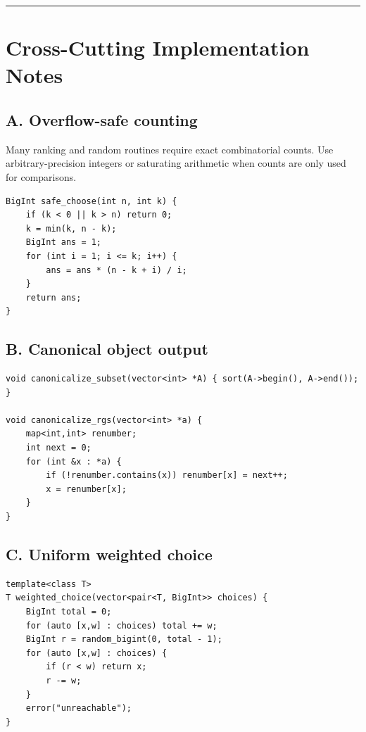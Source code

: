 \documentclass[11pt]{article}
\begin{document}
\begin{center}\rule{0.5\linewidth}{0.5pt}\end{center}

\section{Cross-Cutting Implementation Notes}\label{cross-cutting-implementation-notes}

\subsection{A. Overflow-safe counting}\label{a.-overflow-safe-counting}

Many ranking and random routines require exact combinatorial counts. Use arbitrary-precision integers or saturating arithmetic when counts are only used for comparisons.

\begin{verbatim}
BigInt safe_choose(int n, int k) {
    if (k < 0 || k > n) return 0;
    k = min(k, n - k);
    BigInt ans = 1;
    for (int i = 1; i <= k; i++) {
        ans = ans * (n - k + i) / i;
    }
    return ans;
}
\end{verbatim}

\subsection{B. Canonical object output}\label{b.-canonical-object-output}

\begin{verbatim}
void canonicalize_subset(vector<int> *A) { sort(A->begin(), A->end()); }

void canonicalize_rgs(vector<int> *a) {
    map<int,int> renumber;
    int next = 0;
    for (int &x : *a) {
        if (!renumber.contains(x)) renumber[x] = next++;
        x = renumber[x];
    }
}
\end{verbatim}

\subsection{C. Uniform weighted choice}\label{c.-uniform-weighted-choice}

\begin{verbatim}
template<class T>
T weighted_choice(vector<pair<T, BigInt>> choices) {
    BigInt total = 0;
    for (auto [x,w] : choices) total += w;
    BigInt r = random_bigint(0, total - 1);
    for (auto [x,w] : choices) {
        if (r < w) return x;
        r -= w;
    }
    error("unreachable");
}
\end{verbatim}
\end{document}
